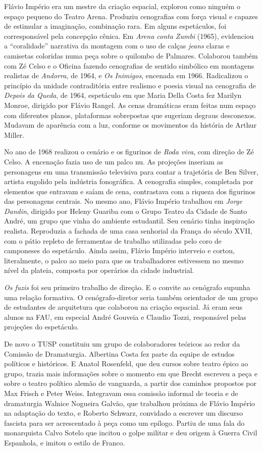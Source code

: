 Flávio Império era um mestre da criação espacial, explorou como ninguém
o espaço pequeno do Teatro Arena. Produziu cenografias com força visual
e capazes de estimular a imaginação, combinação rara. Em alguns
espetáculos, foi corresponsável pela concepção cênica. Em \textit{Arena
conta Zumbi} (1965), evidenciou a “coralidade” narrativa da montagem com
o uso de calças \textit{jeans} claras e camisetas coloridas numa peça sobre
o quilombo de Palmares. Colaborou também com Zé Celso e o Oficina
fazendo cenografias de sentido simbólico em montagens realistas de
\textit{Andorra}, de 1964, e \textit{Os Inimigos}, encenada em 1966.
Radicalizou o princípio da unidade contraditória entre realismo e poesia
visual na cenografia de \textit{Depois da Queda}, de 1964, espetáculo em
que Maria Della Costa fez Marilyn Monroe, dirigido por Flávio Rangel. As
cenas dramáticas eram feitas num espaço com diferentes planos,
plataformas sobrepostas que sugeriam degraus desconexos. Mudavam de
aparência com a luz, conforme os movimentos da história de Arthur
Miller.

No ano de 1968 realizou o cenário e os figurinos de \textit{Roda viva}, com
direção de Zé Celso. A encenação fazia uso de um palco nu. As projeções
inseriam as personagens em uma transmissão televisiva para contar a
trajetória de Ben Silver, artista engolido pela indústria fonográfica. A
cenografia simples, completada por elementos que entravam e saíam de
cena, contrastava com a riqueza dos figurinos das personagens centrais.
No mesmo ano, Flávio Império trabalhou em \textit{Jorge Dandin}, dirigido
por Heleny Guariba com o Grupo Teatro da Cidade de Santo André, um grupo
que vinha do ambiente estudantil. Seu cenário tinha inspiração realista.
Reproduzia a fachada de uma casa senhorial da França do século XVII, com
o pátio repleto de ferramentas de trabalho utilizadas pelo coro de
camponeses do espetáculo. Ainda assim, Flávio Império interveio e
cortou, literalmente, o palco ao meio para que os trabalhadores
estivessem no mesmo nível da plateia, composta por operários da cidade
industrial.

\textit{Os fuzis} foi seu primeiro trabalho de direção. E o convite ao
cenógrafo supunha uma relação formativa. O cenógrafo-diretor seria
também orientador de um grupo de estudantes de arquitetura que colaborou
na criação espacial. Já eram seus alunos na FAU, em especial André
Gouveia e Claudio Tozzi, responsável pelas projeções do espetáculo.

De novo o TUSP constituiu um grupo de colaboradores teóricos ao redor da
Comissão de Dramaturgia. Albertina Costa fez parte da equipe de estudos
políticos e históricos. E Anatol Rosenfeld, que deu cursos sobre teatro
épico ao grupo, trazia mais informações sobre o momento em que Brecht
escreveu a peça e sobre o teatro político alemão de vanguarda, a partir
dos caminhos propostos por Max Frisch e Peter Weiss. Integravam essa
comissão informal de teoria e de dramaturgia Walnice Nogueira Galvão,
que trabalhou próxima de Flávio Império na adaptação do texto, e Roberto
Schwarz, convidado a escrever um discurso fascista para ser acrescentado
à peça como um epílogo. Partiu de uma fala do monarquista Calvo Sotelo
que incitou o golpe militar e deu origem à Guerra Civil Espanhola, e
imitou o estilo de Franco.

